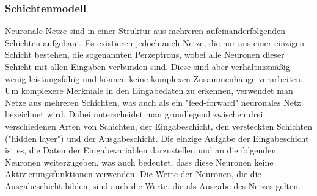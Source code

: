 \subsubsection{Schichtenmodell}\label{subsec:neuronen:schichtenmodell}
Neuronale Netze sind in einer Struktur aus mehreren aufeinanderfolgenden Schichten aufgebaut.
Es existieren jedoch auch Netze, die nur aus einer einzigen Schicht bestehen, die sogenannten Perzeptrons, wobei alle Neuronen dieser Schicht mit allen Eingaben verbunden sind.
Diese sind aber verhältnismäßig wenig leistungsfähig und können keine komplexen Zusammenhänge verarbeiten.
Um komplexere Merkmale in den Eingabedaten zu erkennen, verwendet man Netze aus mehreren Schichten, was auch als ein "feed-forward" neuronales Netz bezeichnet wird.
Dabei unterscheidet man grundlegend zwischen drei verschiedenen Arten von Schichten, der Eingabeschicht, den versteckten Schichten ("hidden layer") und der Ausgabeschicht.
Die einzige Aufgabe der Eingabeschicht ist es, die Daten der Eingabevariablen darzustellen und an die folgenden Neuronen weiterzugeben, was auch bedeutet, dass diese Neuronen keine Aktivierungsfunktionen verwenden.
Die Werte der Neuronen, die die Ausgabeschicht bilden, sind auch die Werte, die als Ausgabe des Netzes gelten.
